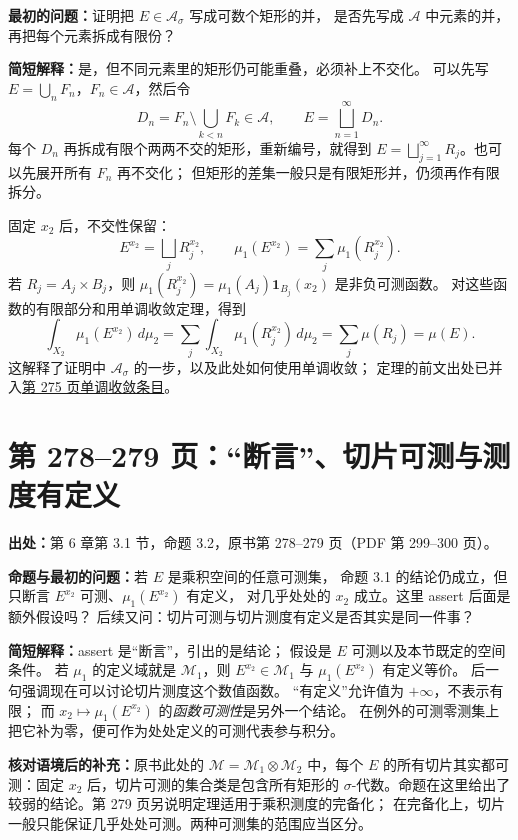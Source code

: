 \documentclass[UTF8,a4paper,11pt]{ctexart}
\begin{document}
\textbf{最初的问题：}证明把 $E\in\mathcal A_\sigma$ 写成可数个矩形的并，
是否先写成 $\mathcal A$ 中元素的并，再把每个元素拆成有限份？

\textbf{简短解释：}是，但不同元素里的矩形仍可能重叠，必须补上不交化。
可以先写 $E=\bigcup_nF_n$，$F_n\in\mathcal A$，然后令
\[
D_n=F_n\setminus\bigcup_{k<n}F_k\in\mathcal A,
\qquad E=\bigsqcup_{n=1}^{\infty}D_n.
\]
每个 $D_n$ 再拆成有限个两两不交的矩形，重新编号，就得到
$E=\bigsqcup_{j=1}^{\infty}R_j$。也可以先展开所有 $F_n$ 再不交化；
但矩形的差集一般只是有限矩形并，仍须再作有限拆分。

固定 $x_2$ 后，不交性保留：
\[
E^{x_2}=\bigsqcup_jR_j^{x_2},\qquad
\mu_1(E^{x_2})=\sum_j\mu_1(R_j^{x_2}).
\]
若 $R_j=A_j\times B_j$，则
$\mu_1(R_j^{x_2})=\mu_1(A_j)\mathbf1_{B_j}(x_2)$ 是非负可测函数。
对这些函数的有限部分和用单调收敛定理，得到
\[
\int_{X_2}\mu_1(E^{x_2})\,d\mu_2
=\sum_j\int_{X_2}\mu_1(R_j^{x_2})\,d\mu_2
=\sum_j\mu(R_j)=\mu(E).
\]
这解释了证明中 $\mathcal A_\sigma$ 的一步，以及此处如何使用单调收敛；
定理的前文出处已并入\hyperref[note:stein-ch6-p275-mct]{第 275 页单调收敛条目}。

\section{第 278--279 页：“断言”、切片可测与测度有定义}
\label{note:stein-ch6-p278-assert-and-defined}
\textbf{出处：}第 6 章第 3.1 节，命题 3.2，原书第 278--279 页（PDF 第 299--300 页）。

\textbf{命题与最初的问题：}若 $E$ 是乘积空间的任意可测集，
命题 3.1 的结论仍成立，但只断言 $E^{x_2}$ 可测、$\mu_1(E^{x_2})$ 有定义，
对几乎处处的 $x_2$ 成立。这里 assert 后面是额外假设吗？
后续又问：切片可测与切片测度有定义是否其实是同一件事？

\textbf{简短解释：}assert 是“断言”，引出的是结论；
假设是 $E$ 可测以及本节既定的空间条件。
若 $\mu_1$ 的定义域就是 $\mathcal M_1$，则
$E^{x_2}\in\mathcal M_1$ 与 $\mu_1(E^{x_2})$ 有定义等价。
后一句强调现在可以讨论切片测度这个数值函数。
“有定义”允许值为 $+\infty$，不表示有限；
而 $x_2\mapsto\mu_1(E^{x_2})$ 的\emph{函数可测性}是另外一个结论。
在例外的可测零测集上把它补为零，便可作为处处定义的可测代表参与积分。

\textbf{核对语境后的补充：}原书此处的 $\mathcal M=\mathcal M_1\otimes\mathcal M_2$
中，每个 $E$ 的所有切片其实都可测：固定 $x_2$ 后，切片可测的集合类是包含所有矩形的
$\sigma$-代数。命题在这里给出了较弱的结论。第 279 页另说明定理适用于乘积测度的完备化；
在完备化上，切片一般只能保证几乎处处可测。两种可测集的范围应当区分。
\end{document}
